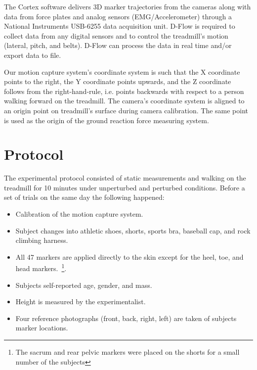 \documentclass[10pt,a4paper,twocolumn]{article}
\begin{document}
The Cortex software delivers 3D marker trajectories from the cameras along with data
from force
plates and analog sensors (EMG/Accelerometer) through a National Instruments
USB-6255 data acquisition unit. D-Flow is required to collect data from any
digital sensors and to control the treadmill's motion (lateral, pitch, and belts). D-Flow
can process the data in real time and/or export data to file.

Our motion capture system's coordinate system is such that the X coordinate
points to the right, the Y coordinate points upwards, and the Z coordinate
follows from the right-hand-rule, i.e. points backwards with respect to a
person walking forward on the treadmill. The camera's coordinate system is
aligned to an origin point on treadmill's surface during camera calibration.
The same point is used as the origin of the ground reaction force measuring
system.

\section*{Protocol}
%
The experimental protocol consisted of static measurements and walking on the
treadmill for 10 minutes under unperturbed and perturbed conditions. Before a
set of trials on the same day the following happened:
%
\begin{itemize}
  \item Calibration of the motion capture system.
  \item Subject changes into athletic shoes, shorts, sports bra, baseball
    cap, and rock climbing harness.
  \item All 47 markers are applied directly to the skin except for the heel,
    toe, and head markers.~\footnote{The sacrum and rear pelvic markers were
    placed on the shorts for a small number of the subjects}.
  \item Subjects self-reported age, gender, and mass.
  \item Height is measured by the experimentalist.
  \item Four reference photographs (front, back, right, left) are taken of
    subjects marker locations.
\end{itemize}
\end{document}
